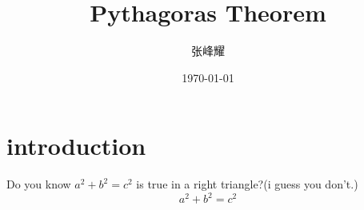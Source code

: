 \documentclass{ctexart}
\title{Pythagoras Theorem}
\author{张峰耀}
\date{\today}
\begin{document}
\maketitle
\section{introduction}
Do you know $a^2+b^2=c^2$ is true in a right triangle?(i guess you don't.)
\[a^2+b^2=c^2\]
\end{document}
